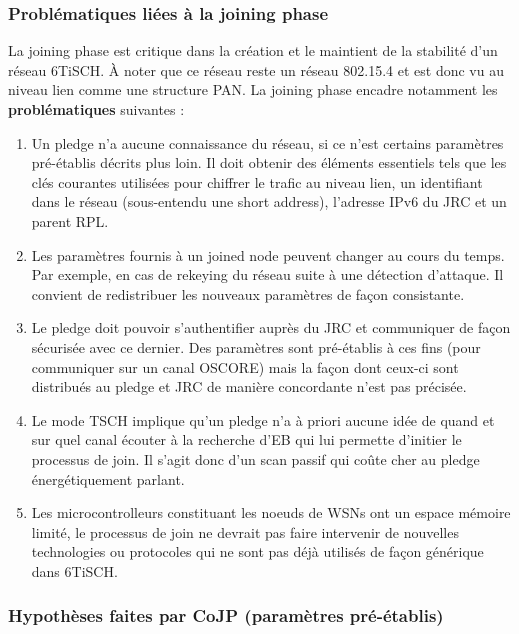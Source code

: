 \documentclass[]{report}
\begin{document}
\newpage

\subsubsection{Problématiques liées à la joining phase}

La joining phase est critique dans la création et le maintient de la stabilité d'un réseau 6TiSCH. À noter que ce réseau reste un réseau 802.15.4 et est donc vu au niveau lien comme une structure PAN. La joining phase encadre notamment les \textbf{problématiques} suivantes :
\vspace{0.2cm}
\begin{enumerate}
\item Un pledge n'a aucune connaissance du réseau, si ce n'est certains paramètres pré-établis décrits plus loin. Il doit obtenir des éléments essentiels tels que les clés courantes utilisées pour chiffrer le trafic au niveau lien, un identifiant dans le réseau (sous-entendu une short address), l'adresse IPv6 du JRC et un parent RPL.
\vspace{0.2cm}
\item Les paramètres fournis à un joined node peuvent changer au cours du temps. Par exemple, en cas de rekeying du réseau suite à une détection d'attaque. Il convient de redistribuer les nouveaux paramètres de façon consistante.
\vspace{0.2cm}
\item Le pledge doit pouvoir s'authentifier auprès du JRC et communiquer de façon sécurisée avec ce dernier. Des paramètres sont pré-établis à ces fins (pour communiquer sur un canal OSCORE) mais la façon dont ceux-ci sont distribués au pledge et JRC de manière concordante n'est pas précisée.
\vspace{0.2cm}
\item Le mode TSCH implique qu'un pledge n'a à priori aucune idée de quand et sur quel canal écouter à la recherche d'EB qui lui permette d'initier le processus de join. Il s'agit donc d'un scan passif qui coûte cher au pledge énergétiquement parlant.
\vspace{0.2cm}
\item Les microcontrolleurs constituant les noeuds de WSNs ont un espace mémoire limité, le processus de join ne devrait pas faire intervenir de nouvelles technologies ou protocoles qui ne sont pas déjà utilisés de façon générique dans 6TiSCH.
\end{enumerate}

\subsubsection{Hypothèses faites par CoJP (paramètres pré-établis)}
\end{document}

